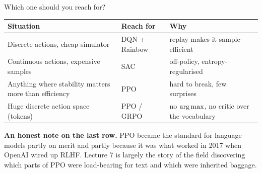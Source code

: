 \documentclass[aspectratio=169]{beamer}
\begin{document}
\begin{frame}{Which one should you reach for?}
  \begin{center}
  \small
  \begin{tabular}{p{5.4cm} p{3.2cm} p{4.0cm}}
    \toprule
    \textbf{Situation} & \textbf{Reach for} & \textbf{Why} \\
    \midrule
    Discrete actions, cheap simulator & DQN + Rainbow & replay makes it sample-efficient \\[3pt]
    Continuous actions, expensive samples & SAC & off-policy, entropy-regularised \\[3pt]
    Anything where stability matters more than efficiency & PPO & hard to break, few surprises \\[3pt]
    Huge discrete action space (tokens) & PPO / GRPO & no $\mathop{\mathrm{arg\,max}}$, no critic over
      the vocabulary \\
    \bottomrule
  \end{tabular}
  \end{center}

  \vskip 10pt
  \begin{tcolorbox}[colback=armorange!12, colframe=armorange, boxrule=0.6pt, arc=2pt]
    \small
    \textbf{An honest note on the last row.} PPO became the standard for language models partly
    on merit and partly because it was what worked in 2017 when OpenAI wired up RLHF. Lecture 7
    is largely the story of the field discovering which parts of PPO were load-bearing for text
    and which were inherited baggage.
  \end{tcolorbox}
\end{frame}
\end{document}
